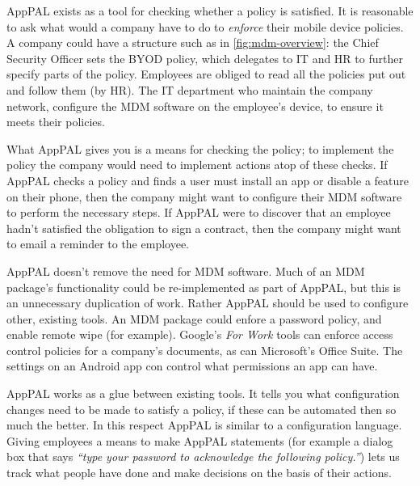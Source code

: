\documentclass[thesis.tex]{subfiles}
\begin{document}
AppPAL exists as a tool for checking whether a policy is satisfied.  It is
reasonable to ask what would a company have to do to \emph{enforce} their mobile
device policies. A company could have a structure such as in
\autoref{fig:mdm-overview}: the Chief Security Officer sets the BYOD policy,
which delegates to IT and HR to further specify parts of the policy.  Employees
are obliged to read all the policies put out and follow them (by HR).  The IT
department who maintain the company network, configure the \ac{MDM} software on
the employee's device, to ensure it meets their policies.

What AppPAL gives you is a means for checking the policy; to implement the
policy the company would need to implement actions atop of these checks.  If
AppPAL checks a policy and finds a user must install an app or disable a feature
on their phone, then the company might want to configure their \ac{MDM} software
to perform the necessary steps.  If AppPAL were to discover that an employee
hadn't satisfied the obligation to sign a contract, then the company might want
to email a reminder to the employee.

AppPAL doesn't remove the need for \ac{MDM} software.  Much of an \ac{MDM} package's functionality could be
re-implemented as part of AppPAL, but this is an unnecessary duplication of work.
Rather AppPAL should be used to configure other, existing tools.  An \ac{MDM} package could enfore a password policy, and enable remote wipe (for example).
Google's \emph{For Work} tools can enforce access control policies for a company's documents, as can Microsoft's Office Suite.
The settings on an Android app con control what permissions an app can have.

AppPAL works as a glue between existing tools.  It tells you
what configuration changes need to be made to satisfy a policy, if these can be
automated then so much the better.  In this respect AppPAL is similar to a
configuration language.  Giving employees a means to
make AppPAL statements (for example a dialog box that says \emph{``type your password to
acknowledge the following policy.''}) lets us track what people have done and
make decisions on the basis of their actions.  

%  
\end{document}

